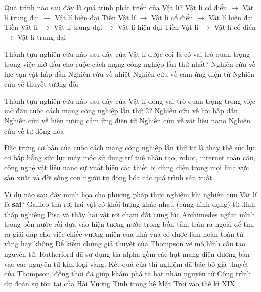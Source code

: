 \begin{ex}%
Quá trình nào sau đây là quá trình phát triển của Vật lí?
\choice
{Vật lí cổ điển $\rightarrow$ Vật lí trung đại $\rightarrow$ Vật lí hiện đại}
{\True Tiền Vật lí $\rightarrow$ Vật lí cổ điển $\rightarrow$ Vật lí hiện đại}
{Tiền Vật lí $\rightarrow$ Vật lí trung đại $\rightarrow$ Vật lí hiện đại}
{Tiền Vật lí $\rightarrow$ Vật lí cổ điển $\rightarrow$ Vật lí trung đại}

\end{ex}
\begin{ex}%
Thành tựu nghiên cứu nào sau đây của Vật lí được coi là có vai trò quan trọng trong việc mở đầu cho cuộc cách mạng công nghiệp lần thứ nhất?
\choice
{Nghiên cứu về lực vạn vật hấp dẫn}
{\True Nghiên cứu về nhiệt}
{Nghiên cứu về cảm ứng điện từ}
{Nghiên cứu về thuyết tương đối}

\end{ex}	
\begin{ex}%
Thành tựu nghiên cứu nào sau đây của Vật lí đóng vai trò quan trọng trong việc mở đầu cuộc cách mạng công nghiệp lần thứ 2?
\choice
{Nghiên cứu về lực hấp dẫn}
{\True Nghiên cứu về hiện tượng cảm ứng điện từ}
{Nghiên cứu về vật liệu nano}
{Nghiên cứu về tự động hóa}

\end{ex}	
\begin{ex}%
Đặc trưng cơ bản của cuộc cách mạng công nghiệp lần thứ tư là
\choice
{thay thế sức lực cơ bắp bằng sức lực máy móc}
{\True sử dụng trí tuệ nhân tạo, robot, internet toàn cầu, công nghệ vật liệu nano}
{sự xuất hiện các thiết bị dùng điện trong mọi lĩnh vực sản xuất và đời sống con người}
{tự động hóa các quá trình sản xuất}	
\end{ex}	
\begin{ex}%
Ví dụ nào sau đây minh họa cho phương pháp thực nghiệm khi nghiên cứu Vật lí là \textbf{sai}?
\choice
{Galileo thả rơi hai vật có khối lượng khác nhau (cùng hình dạng) từ đỉnh tháp nghiêng Pisa và thấy hai vật rơi chạm đất cùng lúc}
{Archimedes ngâm mình trong bồn nước rồi dựa vào hiện tượng nước trong bồn tắm tràn ra ngoài để tìm ra giải đáp cho việc chiếc vương miện của nhà vua có được làm hoàn toàn từ vàng hay không}
{Để kiểm chứng giả thuyết của Thompson về mô hình cấu tạo nguyên tử, Rutherford đã sử dụng tia alpha gồm các hạt mang điện dương bắn vào các nguyên tử kim loại vàng. Kết quả của thí nghiệm đã bác bỏ giả thuyết của Thompson, đồng thời đã giúp khám phá ra hạt nhân nguyên tử}
{\True Công trình dự đoán sự tồn tại của Hải Vương Tinh trong hệ Mặt Trời vào thế kỉ XIX}
\end{ex}	
